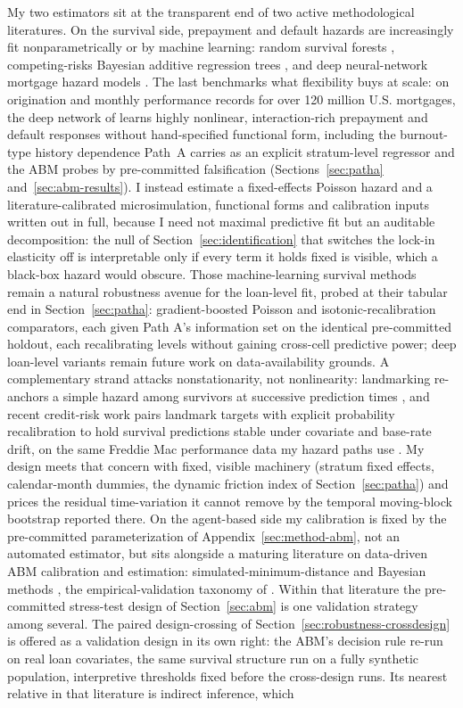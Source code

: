 \documentclass[12pt]{article}
\begin{document}
My two estimators sit at the transparent end of two active methodological literatures. On the survival side, prepayment and default hazards are increasingly fit nonparametrically or by machine learning: random survival forests \citep{ishwaran2008}, competing-risks Bayesian additive regression trees \citep{sparapani2020}, and deep neural-network mortgage hazard models \citep{sadhwani2021}. The last benchmarks what flexibility buys at scale: on origination and monthly performance records for over 120 million U.S. mortgages, the deep network of \citet{sadhwani2021} learns highly nonlinear, interaction-rich prepayment and default responses without hand-specified functional form, including the burnout-type history dependence Path~A carries as an explicit stratum-level regressor and the ABM probes by pre-committed falsification (Sections~\ref{sec:patha} and~\ref{sec:abm-results}). I instead estimate a fixed-effects Poisson hazard and a literature-calibrated microsimulation, functional forms and calibration inputs written out in full, because I need not maximal predictive fit but an auditable decomposition: the null of Section~\ref{sec:identification} that switches the lock-in elasticity off is interpretable only if every term it holds fixed is visible, which a black-box hazard would obscure. Those machine-learning survival methods remain a natural robustness avenue for the loan-level fit, probed at their tabular end in Section~\ref{sec:patha}: gradient-boosted Poisson and isotonic-recalibration comparators, each given Path A's information set on the identical pre-committed holdout, each recalibrating levels without gaining cross-cell predictive power; deep loan-level variants remain future work on data-availability grounds. A complementary strand attacks nonstationarity, not nonlinearity: landmarking re-anchors a simple hazard among survivors at successive prediction times \citep{vanhouwelingen2007,putter2022}, and recent credit-risk work pairs landmark targets with explicit probability recalibration to hold survival predictions stable under covariate and base-rate drift, on the same Freddie Mac performance data my hazard paths use \citep{peng2026}. My design meets that concern with fixed, visible machinery (stratum fixed effects, calendar-month dummies, the dynamic friction index of Section~\ref{sec:patha}) and prices the residual time-variation it cannot remove by the temporal moving-block bootstrap reported there. On the agent-based side my calibration is fixed by the pre-committed parameterization of Appendix~\ref{sec:method-abm}, not an automated estimator, but sits alongside a maturing literature on data-driven ABM calibration and estimation: simulated-minimum-distance and Bayesian methods \citep{grazzini2017,platt2020}, the empirical-validation taxonomy of \citet{fagiolo2007}. Within that literature the pre-committed stress-test design of Section~\ref{sec:abm} is one validation strategy among several. The paired design-crossing of Section~\ref{sec:robustness-crossdesign} is offered as a validation design in its own right: the ABM's decision rule re-run on real loan covariates, the same survival structure run on a fully synthetic population, interpretive thresholds fixed before the cross-design runs. Its nearest relative in that literature is indirect inference, which 
\end{document}
